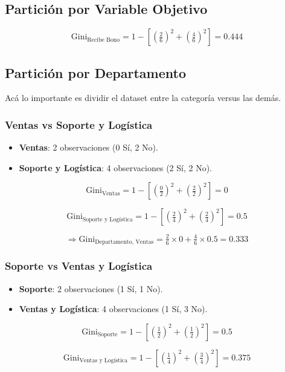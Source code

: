 \documentclass[12pt]{article}
\begin{document}
\subsection{Partición por Variable Objetivo}
\[
  \mathrm{Gini}_{\text{Recibe Bono}} = 1 - \left[\left(\tfrac{2}{6}\right)^2 + \left(\tfrac{4}{6}\right)^2\right] = 0.444
\]

\subsection{Partición por Departamento}

Acá lo importante es dividir el dataset entre la categoría versus las demás.

\subsubsection{Ventas vs Soporte y Logística}

\begin{itemize}
  \item \textbf{Ventas}: 2 observaciones (0 Sí, 2 No).
  \item \textbf{Soporte y Logística}: 4 observaciones (2 Sí, 2 No).
\end{itemize}

\[
  \mathrm{Gini}_{\text{Ventas}} = 1 - \left[\left(\tfrac{0}{2}\right)^2 + \left(\tfrac{2}{2}\right)^2\right] = 0
\]

\[
  \mathrm{Gini}_{\text{Soporte y Logística}} = 1 - \left[\left(\tfrac{2}{4}\right)^2 + \left(\tfrac{2}{4}\right)^2\right] = 0.5
\]

\[
  \Rightarrow \mathrm{Gini}_{\text{Departamento, Ventas}} = \tfrac{2}{6}\times0 + \tfrac{4}{6}\times0.5 = 0.333
\]

\subsubsection{Soporte vs Ventas y Logística}

\begin{itemize}
  \item \textbf{Soporte}: 2 observaciones (1 Sí, 1 No).
  \item \textbf{Ventas y Logística}: 4 observaciones (1 Sí, 3 No).
\end{itemize}

\[
  \mathrm{Gini}_{\text{Soporte}} = 1 - \left[\left(\tfrac{1}{2}\right)^2 + \left(\tfrac{1}{2}\right)^2\right] = 0.5
\]

\[
  \mathrm{Gini}_{\text{Ventas y Logística}} = 1 - \left[\left(\tfrac{1}{4}\right)^2 + \left(\tfrac{3}{4}\right)^2\right] = 0.375
\]
\end{document}
